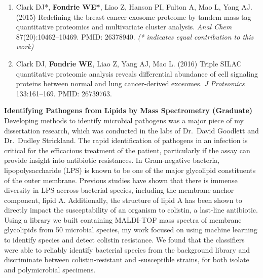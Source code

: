 \documentclass[11pt]{article}
\begin{document}
\begin{enumerate}
  \item Clark DJ*, {\bf Fondrie WE*}, Liao Z, Hanson PI, Fulton A, Mao L, Yang AJ. (2015) Redefining the breast cancer exosome proteome by tandem mass tag quantitative proteomics and multivariate cluster analysis. \textit{Anal Chem} 87(20):10462--10469. PMID: 26378940. {\it (* indicates equal contribution to this work)}
  \item Clark DJ, {\bf Fondrie WE}, Liao Z, Yang AJ, Mao L. (2016) Triple SILAC quantitative proteomic analysis reveals differential abundance of cell signaling proteins between normal and lung cancer-derived exosomes. {\it J Proteomics} 133:161--169. PMID: 26739763.
\end{enumerate}

{\bf Identifying Pathogens from Lipids by Mass Spectrometry (Graduate)} \\
Developing methods to identify microbial pathogens was a major piece of my dissertation research, which was conducted in the labs of Dr.\ David Goodlett and Dr.\ Dudley Strickland. The rapid identification of pathogens in an infection is critical for the efficacious treatment of the patient, particularly if the assay can provide insight into antibiotic resistances. In Gram-negative bacteria, lipopolysaccharide (LPS) is known to be one of the major glycolipid constituents of the outer membrane. Previous studies have shown that there is immense diversity in LPS accross bacterial species, including the membrane anchor component, lipid A. Additionally, the structure of lipid A has been shown to directly impact the susceptability of an organism to colistin, a last-line antibiotic. Using a library we built containing MALDI-TOF mass spectra of membrane glycolipids from 50 microbial species, my work focused on using machine learning to identify species and detect colistin resistance. We found that the classifiers were able to reliably identify bacterial species from the background library and discriminate between colistin-resistant and -susceptible strains, for both isolate and polymicrobial specimens.
\end{document}
